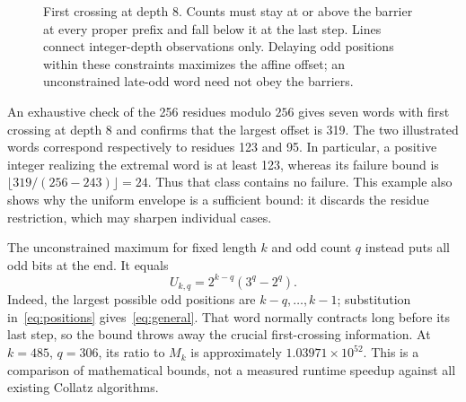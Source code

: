 \documentclass[11pt,a4paper]{amsart}
\theoremstyle{definition}
\theoremstyle{remark}
\begin{document}
\begin{figure}[!ht]
\centering
{}
\caption{First crossing at depth 8. Counts must stay at or above the barrier at every proper prefix and fall below it at the last step. Lines connect integer-depth observations only. Delaying odd positions within these constraints maximizes the affine offset; an unconstrained late-odd word need not obey the barriers.}
\label{fig:barrier}
\end{figure}

An exhaustive check of the 256 residues modulo $256$ gives seven words
with first crossing at depth 8 and confirms that the largest offset is
319. The two illustrated words correspond respectively to residues 123
and 95. In particular, a positive integer realizing the extremal word
is at least 123, whereas its failure bound is
$\lfloor319/(256-243)\rfloor=24$. Thus that class contains no failure.
This example also shows why the uniform envelope is a sufficient bound:
it discards the residue restriction, which may sharpen individual cases.

The unconstrained maximum for fixed length $k$ and odd count $q$ instead
puts all odd bits at the end. It equals
\begin{equation}\label{eq:general}
U_{k,q}=2^{k-q}(3^q-2^q).
\end{equation}
Indeed, the largest possible odd positions are $k-q,\ldots,k-1$;
substitution in~\eqref{eq:positions} gives~\eqref{eq:general}.
That word normally contracts long before its last step, so the bound
throws away the crucial first-crossing information. At $k=485$, $q=306$,
its ratio to $M_k$ is approximately $1.03971\times10^{52}$.
This is a comparison of mathematical bounds, not a measured runtime
speedup against all existing Collatz algorithms.
\end{document}
